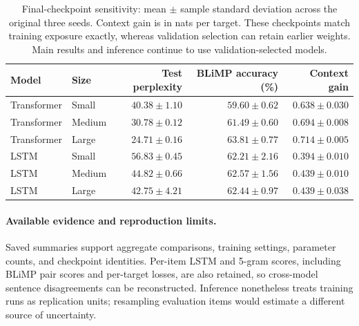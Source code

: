 \documentclass[10pt]{article}
\begin{document}
\begin{table}[ht]
\centering
\small
\begin{tabular}{llrrr}
\toprule
Model & Size & Test perplexity & BLiMP accuracy (\%) & Context gain \\
\midrule
Transformer & Small & $40.38\pm1.10$ & $59.60\pm0.62$ & $0.638\pm0.030$ \\
Transformer & Medium & $30.78\pm0.12$ & $61.49\pm0.60$ & $0.694\pm0.008$ \\
Transformer & Large & $24.71\pm0.16$ & $63.81\pm0.77$ & $0.714\pm0.005$ \\
LSTM & Small & $56.83\pm0.45$ & $62.21\pm2.16$ & $0.394\pm0.010$ \\
LSTM & Medium & $44.82\pm0.66$ & $62.57\pm1.56$ & $0.439\pm0.010$ \\
LSTM & Large & $42.75\pm4.21$ & $62.44\pm0.97$ & $0.439\pm0.038$ \\
\bottomrule
\end{tabular}
\caption{Final-checkpoint sensitivity: mean $\pm$ sample standard deviation across the original three seeds. Context gain is in nats per target. These checkpoints match training exposure exactly, whereas validation selection can retain earlier weights. Main results and inference continue to use validation-selected models.}
\label{tab:finalbudget}
\end{table}

\paragraph{Available evidence and reproduction limits.}
Saved summaries support aggregate comparisons, training settings, parameter counts, and checkpoint identities. Per-item LSTM and 5-gram scores, including BLiMP pair scores and per-target losses, are also retained, so cross-model sentence disagreements can be reconstructed. Inference nonetheless treats training runs as replication units; resampling evaluation items would estimate a different source of uncertainty.
\end{document}

